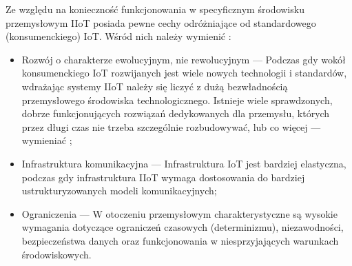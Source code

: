 \documentclass[a4paper, 12pt, twoside]{article}
\begin{document}
Ze względu na konieczność funkcjonowania w specyficznym środowisku przemysłowym
IIoT posiada pewne cechy odróżniające od standardowego (konsumenckiego) IoT.
Wśród nich należy wymienić \cite{iiot-challenges-opportunities-directions}:
\begin{itemize}
    \itemsep0em 
    \item Rozwój o charakterze ewolucyjnym, nie rewolucyjnym
    --- Podczas gdy wokół konsumenckiego IoT rozwijanych jest wiele nowych technologii i standardów, 
    wdrażając systemy IIoT należy się liczyć z dużą bezwładnością
    przemysłowego środowiska technologicznego. Istnieje wiele sprawdzonych, dobrze
    funkcjonujących rozwiązań dedykowanych dla przemysłu, których przez długi czas
    nie trzeba szczególnie rozbudowywać, lub co więcej --- wymieniać \cite{isp};
    \item Infrastruktura komunikacyjna 
    --- Infrastruktura IoT jest bardziej elastyczna, podczas gdy infrastruktura
    IIoT wymaga dostosowania do bardziej ustrukturyzowanych modeli komunikacyjnych;
    \item Ograniczenia
    --- W otoczeniu przemysłowym charakterystyczne są wysokie wymagania dotyczące
    ograniczeń czasowych (determinizmu), niezawodności, bezpieczeństwa danych oraz
    funkcjonowania w niesprzyjających warunkach środowiskowych.
\end{itemize}
\end{document}
